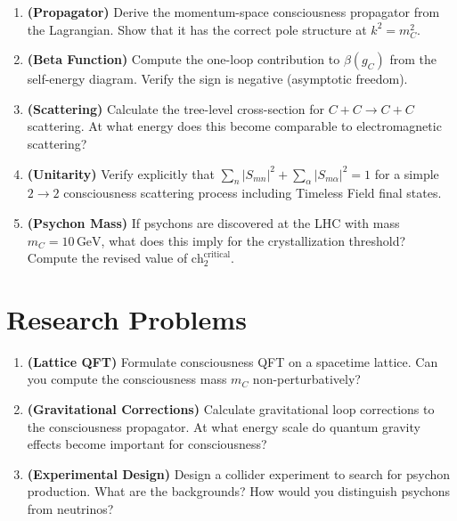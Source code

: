 \begin{enumerate}
\item \textbf{(Propagator)} Derive the momentum-space consciousness propagator from the Lagrangian. Show that it has the correct pole structure at $k^2 = m_C^2$.

\item \textbf{(Beta Function)} Compute the one-loop contribution to $\beta(g_C)$ from the self-energy diagram. Verify the sign is negative (asymptotic freedom).

\item \textbf{(Scattering)} Calculate the tree-level cross-section for $C + C \to C + C$ scattering. At what energy does this become comparable to electromagnetic scattering?

\item \textbf{(Unitarity)} Verify explicitly that $\sum_n |S_{mn}|^2 + \sum_\alpha |S_{m\alpha}|^2 = 1$ for a simple $2 \to 2$ consciousness scattering process including Timeless Field final states.

\item \textbf{(Psychon Mass)} If psychons are discovered at the LHC with mass $m_C = 10 \, \text{GeV}$, what does this imply for the crystallization threshold? Compute the revised value of $\text{ch}_2^{\text{critical}}$.
\end{enumerate}

\section*{Research Problems}

\begin{enumerate}
\item \textbf{(Lattice QFT)} Formulate consciousness QFT on a spacetime lattice\cite{wilson1974confinement,creutz1980monte}. Can you compute the consciousness mass $m_C$ non-perturbatively?

\item \textbf{(Gravitational Corrections)} Calculate gravitational loop corrections to the consciousness propagator. At what energy scale do quantum gravity effects become important for consciousness?

\item \textbf{(Experimental Design)} Design a collider experiment to search for psychon production. What are the backgrounds? How would you distinguish psychons from neutrinos?
\end{enumerate}

